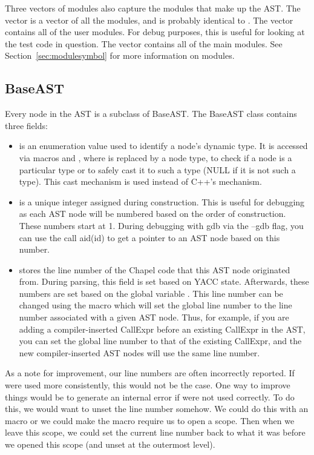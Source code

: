 \documentclass[10pt]{article}
\begin{document}
Three vectors of modules also capture the modules that make up the
AST.  The vector  is a vector of all the modules, and
is probably identical to .  The vector
 contains all of the user modules.  For debug
purposes, this is useful for looking at the test code in question.
The vector  contains all of the main modules.  See
Section~\ref{sec:modulesymbol} for more information on modules.

\subsection{BaseAST}

Every node in the AST is a subclass of BaseAST.  The BaseAST class
contains three fields:
\begin{itemize}
\item {} is an enumeration value used to identify a
  node's dynamic type.  It is accessed via macros  and
  , where  is replaced by a node type, to check if a
  node is a particular type or to safely cast it to such a type (NULL
  if it is not such a type).  This cast mechanism is used instead of
  C++'s  mechanism.

\item {} is a unique integer assigned during construction.
  This is useful for debugging as each AST node will be numbered based
  on the order of construction.  These numbers start at 1.  During
  debugging with gdb via the --gdb flag, you can use the call aid(id)
  to get a pointer to an AST node based on this number.

\item {} stores the line number of the Chapel code that
  this AST node originated from.  During parsing, this field is set
  based on YACC state.  Afterwards, these numbers are set based on the
  global variable .  This line number can be changed
  using the macro  which will set the global line
  number to the line number associated with a given AST node.  Thus,
  for example, if you are adding a compiler-inserted CallExpr before
  an existing CallExpr in the AST, you can set the global line number
  to that of the existing CallExpr, and the new compiler-inserted AST
  nodes will use the same line number.
\end{itemize}

As a note for improvement, our line numbers are often incorrectly
reported.  If  were used more consistently, this would
not be the case.  One way to improve things would be to generate an
internal error if  were not used correctly.  To do
this, we would want to unset the line number somehow.  We could do
this with an  macro or we could make the
 macro require us to open a scope.  Then when we leave
this scope, we could set the current line number back to what it was
before we opened this scope (and unset at the outermost level).
\end{document}
